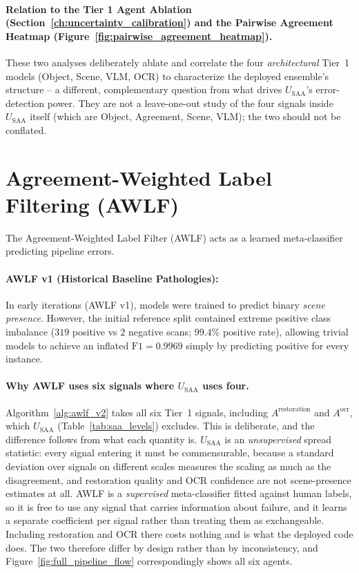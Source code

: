 \documentclass[12pt,a4paper]{report}
\begin{document}
\paragraph{Relation to the Tier 1 Agent Ablation (Section~\ref{ch:uncertainty_calibration}) and the Pairwise Agreement Heatmap (Figure~\ref{fig:pairwise_agreement_heatmap}).} These two analyses deliberately ablate and correlate the four \emph{architectural} Tier~1 models (Object, Scene, VLM, OCR) to characterize the deployed ensemble's structure -- a different, complementary question from what drives $U_{\text{SAA}}$'s error-detection power. They are not a leave-one-out study of the four signals inside $U_{\text{SAA}}$ itself (which are Object, Agreement, Scene, VLM); the two should not be conflated.

\section{Agreement-Weighted Label Filtering (AWLF)}
\label{sec:awlf}
The Agreement-Weighted Label Filter (AWLF) acts as a learned meta-classifier predicting pipeline errors. 

\paragraph{AWLF v1 (Historical Baseline Pathologies):} In early iterations (AWLF v1), models were trained to predict binary \textit{scene presence}. However, the initial reference split contained extreme positive class imbalance ($319$ positive vs $2$ negative scans; $99.4\%$ positive rate), allowing trivial models to achieve an inflated $\text{F1}=0.9969$ simply by predicting positive for every instance. 

\paragraph{Why AWLF uses six signals where $U_{\text{SAA}}$ uses four.} Algorithm~\ref{alg:awlf_v2} takes all six Tier~1 signals, including $A^{\text{restoration}}$ and $A^{\text{ocr}}$, which $U_{\text{SAA}}$ (Table~\ref{tab:saa_levels}) excludes. This is deliberate, and the difference follows from what each quantity is. $U_{\text{SAA}}$ is an \emph{unsupervised} spread statistic: every signal entering it must be commensurable, because a standard deviation over signals on different scales measures the scaling as much as the disagreement, and restoration quality and OCR confidence are not scene-presence estimates at all. AWLF is a \emph{supervised} meta-classifier fitted against human labels, so it is free to use any signal that carries information about failure, and it learns a separate coefficient per signal rather than treating them as exchangeable. Including restoration and OCR there costs nothing and is what the deployed code does. The two therefore differ by design rather than by inconsistency, and Figure~\ref{fig:full_pipeline_flow} correspondingly shows all six agents.
\end{document}
